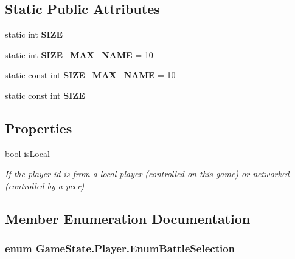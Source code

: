 \subsection*{Static Public Attributes}
\begin{DoxyCompactItemize}
\item 
static int {\bfseries S\-I\-Z\-E}
\item 
\hypertarget{struct_game_state_1_1_player_a1cdc9de8183b220e87632f7f6a7147d0}{static int {\bfseries S\-I\-Z\-E\-\_\-\-M\-A\-X\-\_\-\-N\-A\-M\-E} = 10}\label{struct_game_state_1_1_player_a1cdc9de8183b220e87632f7f6a7147d0}

\item 
\hypertarget{struct_game_state_1_1_player_a16d0264ca6adfedb582e22f59a550fc5}{static const int {\bfseries S\-I\-Z\-E\-\_\-\-M\-A\-X\-\_\-\-N\-A\-M\-E} = 10}\label{struct_game_state_1_1_player_a16d0264ca6adfedb582e22f59a550fc5}

\item 
static const int {\bfseries S\-I\-Z\-E}
\end{DoxyCompactItemize}
\subsection*{Properties}
\begin{DoxyCompactItemize}
\item 
bool \hyperlink{struct_game_state_1_1_player_affd7c601a6d763dafdc59a58c415e9e7}{is\-Local}
\begin{DoxyCompactList}\small\item\em If the player id is from a local player (controlled on this game) or networked (controlled by a peer) \end{DoxyCompactList}\end{DoxyCompactItemize}


\subsection{Member Enumeration Documentation}
\hypertarget{struct_game_state_1_1_player_a9f54c5eca1e60acbaa2074e981f51615}{
\subsubsection[{Enum\-Battle\-Selection}]{\setlength{\rightskip}{0pt plus 5cm}enum {\bf Game\-State.\-Player.\-Enum\-Battle\-Selection}}}\label{struct_game_state_1_1_player_a9f54c5eca1e60acbaa2074e981f51615}



